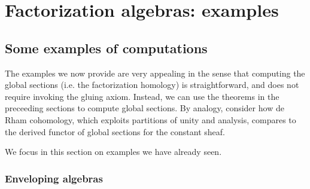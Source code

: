 \chapter{Factorization algebras: examples}

\section{Some examples of computations}

The examples we now provide are very appealing in the sense that computing the global sections (i.e. the factorization homology) is straightforward, and does not require invoking the gluing axiom. Instead, we can use the theorems in the preceeding sections to compute global sections. By analogy, consider how de Rham cohomology, which exploits partitions of unity and analysis, compares to the derived functor of global sections for the constant sheaf.

We focus in this section on examples we have already seen.

\subsection{Enveloping algebras}

